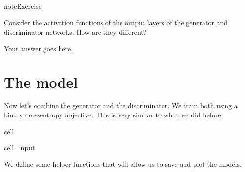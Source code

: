 \documentclass[letterpaper,10pt,english]{jupyterBook}
\begin{document}
\begin{sphinxadmonition}{note}{Exercise}

\sphinxAtStartPar
Consider the activation functions of the output layers of the generator and discriminator networks. How are they different?
\end{sphinxadmonition}

\sphinxAtStartPar
Your answer goes here.


\section{The model}
\label{\detokenize{notebooks/Tutorial4_Generative_Models/Tutorial4_Generative_Models_student:the-model}}
\sphinxAtStartPar
Now  let’s combine the generator and the discriminator. We train both using a binary cross\sphinxhyphen{}entropy objective. This is very similar to what we did before.

\begin{sphinxuseclass}{cell}\begin{sphinxVerbatimInput}

\begin{sphinxuseclass}{cell_input}
\begin{sphinxVerbatim}[commandchars=\\\{\}]
  
  


     
     
  
\end{sphinxVerbatim}

\end{sphinxuseclass}\end{sphinxVerbatimInput}

\end{sphinxuseclass}
\sphinxAtStartPar
We define some helper functions that will allow us to save and plot the models.
\end{document}
